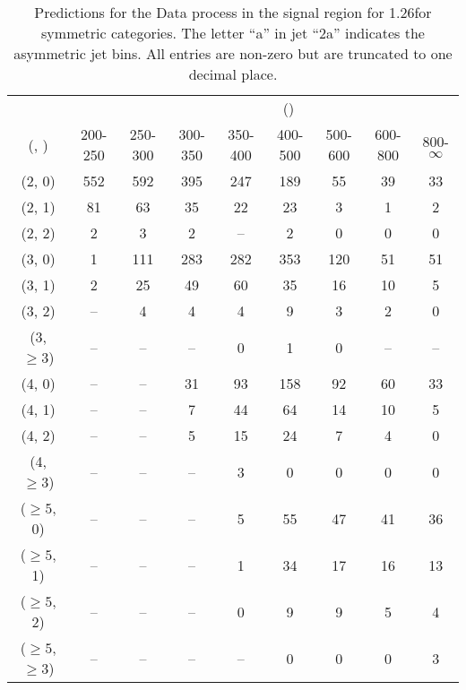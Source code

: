 \begin{table}[h!]
\tiny
\centering
\caption{Predictions for the Data process in the signal region for 1.26\ifb for symmetric categories. The letter ``a'' in jet \eg ``2a''  indicates the asymmetric jet bins. All entries are non-zero but are truncated to one decimal place.\label{tab:predsep_sig_data_sym}}
\begin{tabular}
{ccccccccc}
	\hline\hline
&	& \multicolumn{8}{c}{\scalht (\gev)} \\ 
	 (\njet,  \nb) & 200-250 & 250-300 & 300-350 & 350-400 & 400-500 & 500-600 & 600-800 & 800-$\infty$ \\ [0.8ex] 
\hline
	(2, 0) & 552 & 592 & 395 & 247 & 189 & 55 & 39 & 33 \\[0.5ex] 
	(2, 1) & 81 & 63 & 35 & 22 & 23 & 3 & 1 & 2 \\[0.5ex] 
	(2, 2) & 2 & 3 & 2 & -- & 2 & 0 & 0 & 0 \\[0.5ex] 
	(3, 0) & 1 & 111 & 283 & 282 & 353 & 120 & 51 & 51 \\[0.5ex] 
	(3, 1) & 2 & 25 & 49 & 60 & 35 & 16 & 10 & 5 \\[0.5ex] 
	(3, 2) & -- & 4 & 4 & 4 & 9 & 3 & 2 & 0 \\[0.5ex] 
	(3, $\ge3$) & -- & -- & -- & 0 & 1 & 0 & -- & -- \\[0.5ex] 
	(4, 0) & -- & -- & 31 & 93 & 158 & 92 & 60 & 33 \\[0.5ex] 
	(4, 1) & -- & -- & 7 & 44 & 64 & 14 & 10 & 5 \\[0.5ex] 
	(4, 2) & -- & -- & 5 & 15 & 24 & 7 & 4 & 0 \\[0.5ex] 
	(4, $\ge3$) & -- & -- & -- & 3 & 0 & 0 & 0 & 0 \\[0.5ex] 
	($\ge5$, 0) & -- & -- & -- & 5 & 55 & 47 & 41 & 36 \\[0.5ex] 
	($\ge5$, 1) & -- & -- & -- & 1 & 34 & 17 & 16 & 13 \\[0.5ex] 
	($\ge5$, 2) & -- & -- & -- & 0 & 9 & 9 & 5 & 4 \\[0.5ex] 
	($\ge5$, $\ge3$) & -- & -- & -- & -- & 0 & 0 & 0 & 3 \\[0.5ex] 
	\hline
	\hline
\end{tabular}
\end{table}
